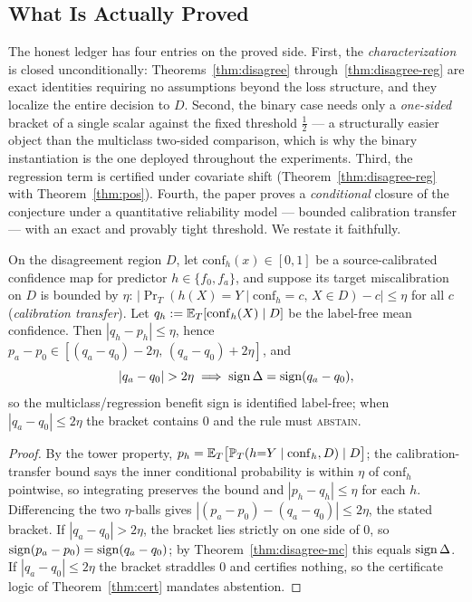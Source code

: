 \subsection{What Is Actually Proved}
\label{sec:t2-open-partial}

The honest ledger has four entries on the proved side. First, the
\emph{characterization} is closed unconditionally: Theorems~\ref{thm:disagree}
through~\ref{thm:disagree-reg} are exact identities requiring no assumptions beyond
the loss structure, and they localize the entire decision to $D$. Second, the binary
case needs only a \emph{one-sided} bracket of a single scalar against the fixed
threshold $\tfrac12$ --- a structurally easier object than the multiclass two-sided
comparison, which is why the binary instantiation is the one deployed throughout the
experiments. Third, the regression term is certified under covariate shift
(Theorem~\ref{thm:disagree-reg} with Theorem~\ref{thm:pos}). Fourth, the paper proves
a \emph{conditional} closure of the conjecture under a quantitative reliability model
--- bounded calibration transfer --- with an exact and provably tight threshold. We
restate it faithfully.

\begin{proposition}
\label{sec:t2-prop-caltransfer}
On the disagreement region $D$, let $\mathrm{conf}_h(x)\in[0,1]$ be a source-calibrated
confidence map for predictor $h\in\{f_0,f_a\}$, and suppose its target miscalibration
on $D$ is bounded by $\eta$:
$|\Pr_T(h(X){=}Y\mid \mathrm{conf}_h{=}c,\,X\in D)-c|\le\eta$ for all $c$
(\emph{calibration transfer}). Let $q_h:=\mathbb{E}_T[\mathrm{conf}_h(X)\mid D]$ be the
label-free mean confidence. Then $|q_h-p_h|\le\eta$, hence
$p_a-p_0\in[(q_a-q_0)-2\eta,\,(q_a-q_0)+2\eta]$, and
\[
|q_a-q_0|>2\eta \;\Longrightarrow\; \sign\Delta=\sign(q_a-q_0),
\]
so the multiclass/regression benefit sign is identified label-free; when
$|q_a-q_0|\le2\eta$ the bracket contains $0$ and the rule must \textsc{abstain}.
\end{proposition}

\begin{proof}
By the tower property,
$p_h=\mathbb{E}_T\bigl[\mathbb{P}_T(h{=}Y\mid \mathrm{conf}_h,D)\mid D\bigr]$; the
calibration-transfer bound says the inner conditional probability is within $\eta$ of
$\mathrm{conf}_h$ pointwise, so integrating preserves the bound and $|p_h-q_h|\le\eta$
for each $h$. Differencing the two $\eta$-balls gives
$|(p_a-p_0)-(q_a-q_0)|\le2\eta$, the stated bracket. If $|q_a-q_0|>2\eta$, the bracket
lies strictly on one side of $0$, so $\operatorname{sign}(p_a-p_0)=\operatorname{sign}(q_a-q_0)$; by
Theorem~\ref{thm:disagree-mc} this equals $\operatorname{sign}\Delta$. If $|q_a-q_0|\le2\eta$ the
bracket straddles $0$ and certifies nothing, so the certificate logic of
Theorem~\ref{thm:cert} mandates abstention. \qedhere
\end{proof}


